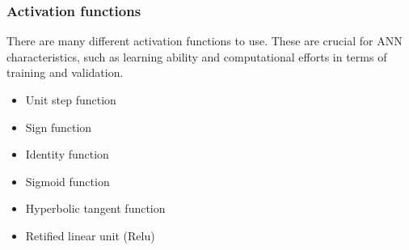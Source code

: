 \subsubsection{Activation functions}
There are many different activation functions to use. These are crucial for ANN characteristics, such as learning ability and computational efforts in terms of training and validation.

\begin{itemize}
    \item Unit step function
    \item Sign function
    \item Identity function
    \item Sigmoid function
    \item Hyperbolic tangent function
    \item Retified linear unit (Relu) 
\end{itemize}

